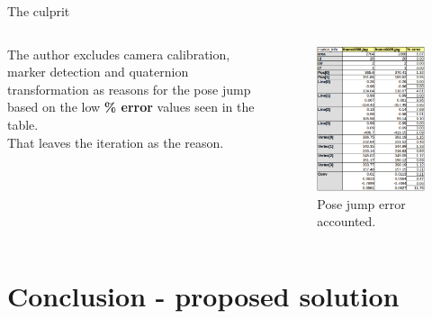 \documentclass[10pt]{beamer}
\begin{document}
\begin{frame}[fragile]{The culprit}
  \begin{columns}
      The author excludes camera calibration, marker detection and quaternion transformation as reasons for the pose jump based on the low \textbf{\% error} values seen in the table.\\
      That leaves the iteration as the reason.
    \vspace{-0.5 cm}
      \begin{figure}
        \centering
        \includegraphics[scale=0.35]{table-extended.png}
        \caption{Pose jump error accounted.}
      \end{figure}
  \end{columns}
\end{frame}


\section{Conclusion - proposed solution}
\end{document}
